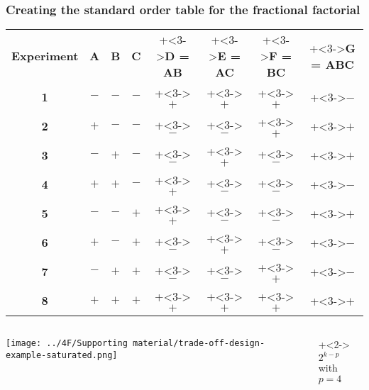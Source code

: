 \begin{frame}\frametitle{Creating the standard order table for the fractional factorial}
	\vspace{0.4cm}
	\begin{tabulary}{\linewidth}{c|ccccccc}
		\textbf{\relax Experiment} & \textbf{\relax A } & \textbf{\relax B} & \textbf{\relax C } & \onslide+<3->{\textbf{\relax D = AB}} & \onslide+<3->{\textbf{\relax E = AC}} & \onslide+<3->{\textbf{\relax F = BC}} & \onslide+<3->{\textbf{\relax G = ABC}} \\ 
		\textbf{1} & \(-\) & \(-\) & \(-\) & \onslide+<3->{\(+\)} & \onslide+<3->{\(+\)} & \onslide+<3->{\(+\)} & \onslide+<3->{\(-\)} \\
		\textbf{2} & \(+\) & \(-\) & \(-\) & \onslide+<3->{\(-\)} & \onslide+<3->{\(-\)} & \onslide+<3->{\(+\)} & \onslide+<3->{\(+\)} \\
		\textbf{3} & \(-\) & \(+\) & \(-\) & \onslide+<3->{\(-\)} & \onslide+<3->{\(+\)} & \onslide+<3->{\(-\)} & \onslide+<3->{\(+\)} \\
		\textbf{4} & \(+\) & \(+\) & \(-\) & \onslide+<3->{\(+\)} & \onslide+<3->{\(-\)} & \onslide+<3->{\(-\)} & \onslide+<3->{\(-\)} \\
		\textbf{5} & \(-\) & \(-\) & \(+\) & \onslide+<3->{\(+\)} & \onslide+<3->{\(-\)} & \onslide+<3->{\(-\)} & \onslide+<3->{\(+\)} \\
		\textbf{6} & \(+\) & \(-\) & \(+\) & \onslide+<3->{\(-\)} & \onslide+<3->{\(+\)} & \onslide+<3->{\(-\)} & \onslide+<3->{\(-\)} \\
		\textbf{7} & \(-\) & \(+\) & \(+\) & \onslide+<3->{\(-\)} & \onslide+<3->{\(-\)} & \onslide+<3->{\(+\)} & \onslide+<3->{\(-\)} \\
		\textbf{8} & \(+\) & \(+\) & \(+\) & \onslide+<3->{\(+\)} & \onslide+<3->{\(+\)} & \onslide+<3->{\(+\)} & \onslide+<3->{\(+\)} \\  
	\end{tabulary}
	
	\vspace{0.4cm}
	
	
	\begin{columns}[T]
		
			\centerline{\texttt{[image: ../4F/Supporting material/trade-off-design-example-saturated.png]}}
		
			\onslide+<2->{
				{\huge $2^{k-p}$\\
				{\normalsize with} $p=4$}
			}
	\end{columns}	
\end{frame}

